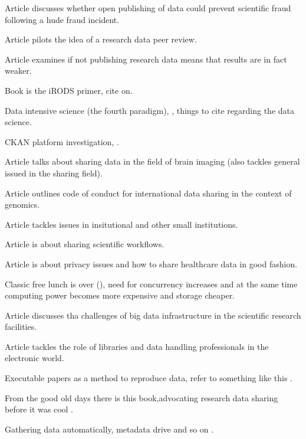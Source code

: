 Article \cite{DBLP:journals/ijdc/DoornDH13} discusses whether open publishing
of data could prevent scientific fraud following a hude fraud incident.

Article \cite{DBLP:journals/ijdc/GrootveldE12} pilots the idea of a research
data peer review.

Article \cite{wicherts2011willingness} examines if not publishing research data
means that results are in fact weaker.

Book \cite{DBLP:series/synthesis/2010Rajasekar} is the iRODS primer, cite
on.

Data intensive science (the fourth paradigm), \cite{DBLP:books/ms/4paradigm09},
things to cite regarding the data science.

CKAN platform investigation, \cite{winn2013open}.

Article \cite{DBLP:journals/fini/PolineBGGHHHHKMPSAK12} talks about sharing
data in the field of brain imaging (also tackles general issued in the sharing
field).

Article \cite{knoppers2011towards} outlines code of conduct for international
data sharing in the context of genomics.

Article \cite{cragin2010data} tackles issues in insitutional and other small
institutions.

Article \cite{DBLP:journals/fgcs/RoureGS09} is about sharing scientific
workflows.

Article \cite{kaye2012tension} is about privacy issues and how to share
healthcare data in good fashion.

Classic free lunch is over (\cite{sutter2005free}), need for concurrency
increases and at the same time computing power becomes more expensive and
storage cheaper.

Article \cite{DBLP:conf/cloudcom/DemchenkoZGWL12} discusses tha challenges
of big data infrastructure in the scientific research facilities.

Article \cite{hjorland2014curating} tackles the role of libraries and data
handling professionals in the electronic world.

Executable papers as a method to reproduce data, refer to something like
this \cite{DBLP:journals/procedia/GorpM11}.

From the good old days there is this book,advocating research data sharing
before it was cool \cite{fienberg1985sharing}.

Gathering data automatically, metadata drive and so on
\cite{DBLP:journals/jbi/HarrisTTPGC09}.

